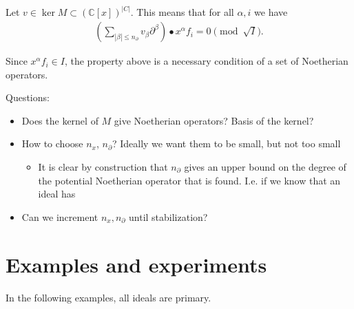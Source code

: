 \documentclass[letterpaper]{article}
\theoremstyle{plain}
\theoremstyle{definition}
\theoremstyle{remark}
\begin{document}
Let $v \in \ker M \subset (\mathbb{C}[x])^{|C|}$. This means that for all $\alpha,i$ we have
\begin{align}
	\left(\sum_{|\beta|\leq n_\partial} v_\beta \partial^\beta\right) \bullet x^\alpha f_i = 0 \pmod{\sqrt I}. \label{eq:operators_from_macaulay_matrix}
\end{align}

Since $x^\alpha f_i \in I$, the property above is a necessary condition of a set of Noetherian operators.

Questions:
\begin{itemize}
	\item Does the kernel of $M$ give Noetherian operators? Basis of the kernel?
	\item How to choose $n_x$, $n_\partial$? Ideally we want them to be small, but not too small
	\begin{itemize}
		\item It is clear by construction that $n_\partial$ gives an upper bound on the degree of the potential Noetherian operator that is found. I.e. if we know that an ideal has 
	\end{itemize}
	\item Can we increment $n_x, n_\partial$ until stabilization?
\end{itemize}


\section{Examples and experiments} %
\label{sec:examples}
In the following examples, all ideals are primary.
\end{document}
